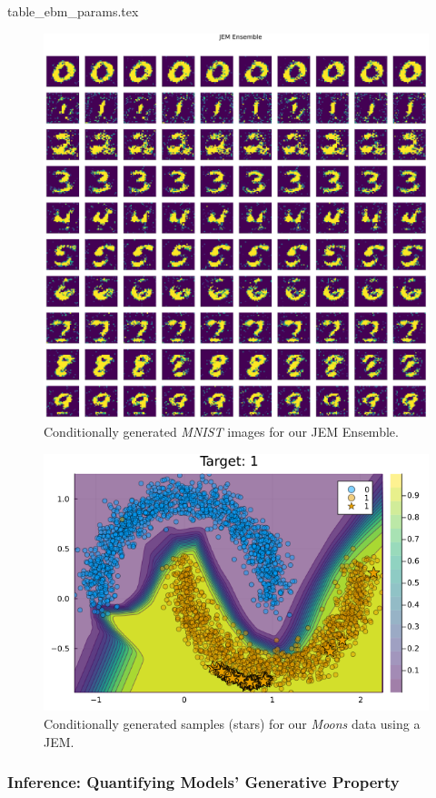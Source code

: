 {table_ebm_params.tex}

\begin{figure}
  \centering
  \includegraphics[width=0.75\linewidth]{../artifacts/results/images/mnist_generated_JEM Ensemble.png}
  \caption{Conditionally generated \textit{MNIST} images for our JEM Ensemble.}\label{fig:mnist-gen}
\end{figure}

\begin{figure}
  \centering
  \includegraphics[width=0.5\linewidth]{../artifacts/results/images/moons_generated_JEM.png}
  \caption{Conditionally generated samples (stars) for our \textit{Moons} data using a JEM.}\label{fig:moons-gen}
\end{figure}
\subsubsection{Inference: Quantifying Models' Generative Property}

